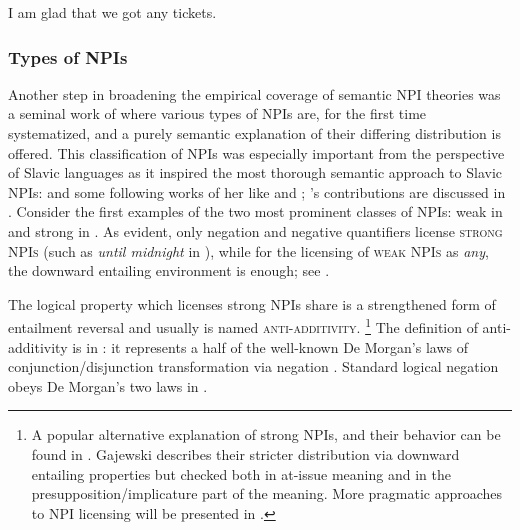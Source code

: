 \documentclass[output=paper,colorlinks,citecolor=brown]{langscibook}
\begin{document}
\ea {}
\z
\z

\ea\label{ex:22} I am glad that we got any tickets.
\z

\subsubsection{Types of NPIs\label{types-of-npis}}

Another step in broadening the empirical coverage of semantic NPI theories was a seminal work of \citet{zwarts1998three} where various types of NPIs are, for the first time systematized, and a purely semantic explanation of their differing distribution is offered. This classification of NPIs was especially important from the perspective of Slavic languages as it inspired the most thorough semantic approach to Slavic NPIs: \citet{Blaszczak2001} and some following works of her like \citet{blaszczak2003negative} and \citet{blaszczak2008puzzle}; \citeauthor{Blaszczak2001}'s contributions are discussed in . Consider the first examples of the two most prominent classes of NPIs: weak in  and strong in . As evident, only negation and negative quantifiers license \textsc{strong NPIs} (such as \emph{until midnight} in ), while for the licensing of \textsc{weak NPIs} as \emph{any}, the downward entailing environment is enough; see .

\ea\label{ex:23}
\z
\z


\ea\label{ex:24}
\z
\z

\noindent The logical property which licenses strong NPIs share is a strengthened form of entailment reversal and usually is named \textsc{anti-additivity}.%
\footnote{A popular alternative explanation of strong NPIs, and their behavior can be found in \citet{gajewski2011licensing}. Gajewski describes their stricter distribution via downward entailing properties but checked both in at-issue meaning and in the presupposition/implicature part of the meaning. More pragmatic approaches to NPI licensing will be presented in .}
The definition of anti-additivity is in : it represents a half of the well-known De Morgan's laws of conjunction/disjunction transformation via negation \citep[46]{tarski1994introduction}. Standard logical negation obeys De Morgan's two laws in .
\end{document}
